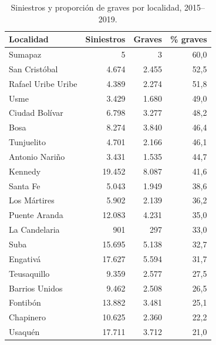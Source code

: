 \begin{table}[h]\centering\small
\caption{Siniestros y proporción de graves por localidad, 2015--2019.}\label{tab:localidad}
\begin{tabular}{lrrr}
\toprule
Localidad & Siniestros & Graves & \% graves \\
\midrule
Sumapaz & 5 & 3 & 60,0 \\
San Cristóbal & 4.674 & 2.455 & 52,5 \\
Rafael Uribe Uribe & 4.389 & 2.274 & 51,8 \\
Usme & 3.429 & 1.680 & 49,0 \\
Ciudad Bolívar & 6.798 & 3.277 & 48,2 \\
Bosa & 8.274 & 3.840 & 46,4 \\
Tunjuelito & 4.701 & 2.166 & 46,1 \\
Antonio Nariño & 3.431 & 1.535 & 44,7 \\
Kennedy & 19.452 & 8.087 & 41,6 \\
Santa Fe & 5.043 & 1.949 & 38,6 \\
Los Mártires & 5.902 & 2.139 & 36,2 \\
Puente Aranda & 12.083 & 4.231 & 35,0 \\
La Candelaria & 901 & 297 & 33,0 \\
Suba & 15.695 & 5.138 & 32,7 \\
Engativá & 17.627 & 5.594 & 31,7 \\
Teusaquillo & 9.359 & 2.577 & 27,5 \\
Barrios Unidos & 9.462 & 2.508 & 26,5 \\
Fontibón & 13.882 & 3.481 & 25,1 \\
Chapinero & 10.625 & 2.360 & 22,2 \\
Usaquén & 17.711 & 3.712 & 21,0 \\
\bottomrule
\end{tabular}
\end{table}